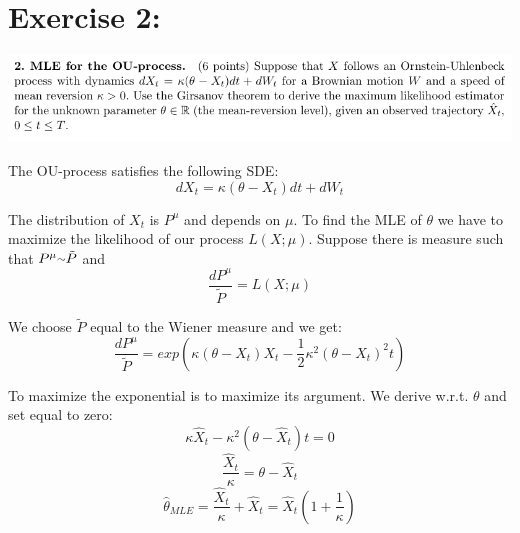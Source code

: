 \documentclass[document.tex]{subfiles}
\begin{document}
\section*{Exercise 2:}


\includegraphics[width=\textwidth]{ex2.png}

The OU-process satisfies the following SDE:
\begin{equation}
dX_t = \kappa(\theta - X_t)dt + dW_t
\end{equation}

The distribution of $X_t$ is $P^{\mu}$ and depends on $\mu$. To find the MLE of $\theta$ we have to maximize the likelihood of our process $L(X;\mu)$. Suppose there is measure such that $P^{\mu} {\raise.17ex\hbox{$\scriptstyle\sim$}} \tilde{P}$ and
\begin{equation}
\frac{dP^{\mu}}{\tilde{P}} = L(X;\mu)
\end{equation}

We choose $\tilde{P}$ equal to the Wiener measure and we get:
\begin{equation}
\frac{dP^{\mu}}{\tilde{P}} = exp(\kappa (\theta - X_t)X_t - \frac{1}{2} \kappa^2(\theta - X_t)^2 t)
\end{equation}

To maximize the exponential is to maximize its argument. We derive w.r.t. $\theta$ and set equal to zero:
\begin{equation}
\kappa \hat{X}_t - \kappa^2(\theta - \hat{X}_t) t = 0
\end{equation}
\begin{equation}
\frac{ \hat{X}_t }{ \kappa } = \theta - \hat{X}_t
\end{equation}
\begin{equation}
\hat{\theta}_{MLE} = \frac{ \hat{X}_t }{ \kappa } + \hat{X}_t = \hat{X}_t (1 + \frac{ 1 }{ \kappa })
\end{equation}
\end{document}
